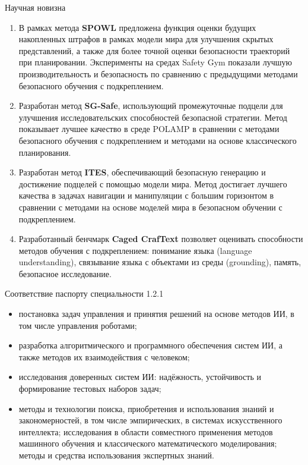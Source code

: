 \begin{frame}[shrink=8]{Научная новизна}
    \footnotesize
    \begin{enumerate}
        \item В рамках метода \textbf{SPOWL} предложена функция оценки
              будущих накопленных штрафов в рамках модели мира для улучшения
              скрытых представлений, а также для более точной оценки
              безопасности траекторий при планировании. Эксперименты на средах
              Safety Gym показали лучшую производительность и безопасность по
              сравнению с предыдущими методами безопасного обучения с
              подкреплением.
        \item Разработан метод \textbf{SG-Safe}, использующий промежуточные
              подцели для улучшения исследовательских способностей безопасной
              стратегии. Метод показывает лучшее качество в среде POLAMP в
              сравнении с методами безопасного обучения с подкреплением и
              методами на основе классического планирования.
        \item Разработан метод \textbf{ITES}, обеспечивающий безопасную генерацию
              и достижение подцелей с помощью модели мира. Метод достигает
              лучшего качества в задачах навигации и манипуляции с большим
              горизонтом в сравнении с методами на основе моделей мира в
              безопасном обучении с подкреплением.
        \item Разработанный бенчмарк \textbf{Caged CrafText} позволяет
              оценивать способности методов обучения с подкреплением:
              понимание языка (language understanding), связывание языка с
              объектами из среды (grounding), память, безопасное исследование.
    \end{enumerate}

    \begin{block}{Соответствие паспорту специальности 1.2.1}
        \scriptsize
        \begin{itemize}
            \item постановка задач управления и принятия решений на основе
                  методов ИИ, в том числе управления роботами;
            \item разработка алгоритмического и программного обеспечения систем
                  ИИ, а также методов их взаимодействия с человеком;
            \item исследования доверенных систем ИИ: надёжность, устойчивость
                  и формирование тестовых наборов задач;
            \item методы и технологии поиска, приобретения и использования
                  знаний и закономерностей, в том числе эмпирических, в системах
                  искусственного интеллекта; исследования в области совместного
                  применения методов машинного обучения и классического
                  математического моделирования; методы и средства использования
                  экспертных знаний.
        \end{itemize}
    \end{block}
\end{frame}

